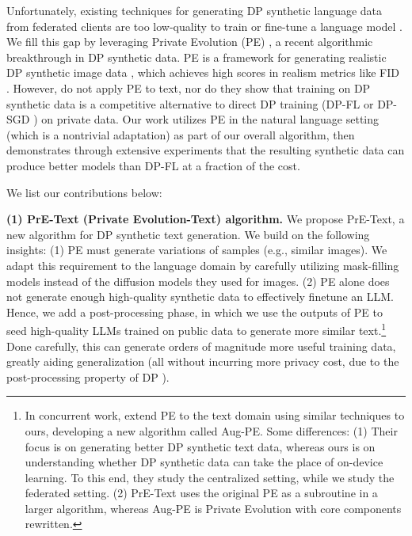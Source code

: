 Unfortunately, existing techniques for generating DP synthetic language data from federated clients are too low-quality to train or fine-tune a language model \cite{augenstein2019generative}.
We fill this gap by leveraging Private Evolution (PE) \citep{lin2023differentially}, a recent algorithmic breakthrough in DP synthetic data. PE is a framework for generating realistic DP synthetic image data \citep{lin2023differentially}, which achieves high scores in realism metrics like FID \citep{heusel2017gans}. However, \citet{lin2023differentially} do not apply PE to text, nor do they show that training on DP synthetic data is a competitive alternative to direct DP training (DP-FL or DP-SGD \citep{abadi2016deep}) on private data. 
Our work utilizes PE in the natural language setting (which is a nontrivial adaptation) as part of our overall algorithm, then demonstrates through extensive experiments that the resulting synthetic data can produce better models than DP-FL at a fraction of the cost. 

We list our contributions below:

\textbf{(1) PrE-Text (Private Evolution-Text) algorithm.} 
We propose PrE-Text, a new algorithm for DP synthetic text generation.  We build on the following insights: (1) PE must generate variations of samples (e.g., similar images). We adapt this requirement to the language domain by carefully utilizing mask-filling models \citep{devlin2018bert, bart} instead of the diffusion models they used for images. (2) PE alone does not generate enough high-quality synthetic data to effectively finetune an LLM. 
Hence, we add a post-processing phase, in which we use the outputs of PE to seed high-quality LLMs trained on public data to generate more similar text.\footnote{In concurrent work, \citet{xie2024differentially} extend PE to the text domain using similar techniques to ours, developing a new algorithm called Aug-PE. Some differences: (1) Their focus is on generating better DP synthetic text data, whereas ours is on understanding whether DP synthetic data can take the place of on-device learning. To this end, they study the centralized setting, while we study the federated setting. (2) PrE-Text uses the original PE as a subroutine in a larger algorithm, whereas Aug-PE is Private Evolution with core components rewritten.} 
Done carefully, this can generate orders of magnitude more useful training data, greatly aiding generalization (all without incurring more privacy cost, due to the post-processing property of DP \citep{dwork2006differential}).


